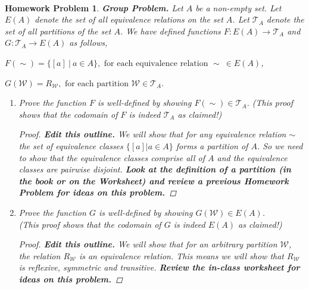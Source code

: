 \documentclass{article}
\newtheorem{hw}{Homework Problem}
\begin{document}
	\underline{\hspace{5in}}


	\
	\begin{hw} {\bf Group Problem.} \newline
		Let $A$ be a non-empty set. Let $E(A)$ denote the set of all equivalence relations on the set $A$. Let $\mathcal{T}_A$ denote the set of all partitions of the set $A$.
		We have defined functions $F: E(A) \rightarrow \mathcal{T}_A$ and $G: \mathcal{T}_A \rightarrow E(A)$ as follows,
		\begin{center}
			$F(\sim) = \{ [a]  \ | \ a \in A \},  \textrm{ for each equivalence relation }  \sim  \  \in E(A)$,
		\end{center}
		\begin{center}
			$G(\mathcal{W}) = R_{\mathcal{W}}, \textrm{ for each partition  } \mathcal{W} \in \mathcal{T}_A.$
		\end{center}
		\begin{enumerate}
			\item  Prove the function $F$ is well-defined by showing $F(\sim) \in \mathcal{T}_A$.  \newline (This proof shows that the codomain of $F$ is indeed $\mathcal{T}_A$ as claimed!)
			\begin{proof}  {\bf Edit this outline.}%
				We will show that for any equivalence relation $\sim$ the set of equivalence classes $\{ [a] | a\in A \}$ forms a partition of $A$.
				So we need to show that the equivalence classes comprise all of $A$ and the equivalence classes are pairwise disjoint.
					{\bf Look at the definition of a partition (in the book or on the Worksheet) and review a previous Homework Problem for ideas on this problem.}
			\end{proof}
			\item  Prove the function $G$ is well-defined by showing $G(\mathcal{W}) \in E(A)$.  \\ (This proof shows that the codomain of $G$ is indeed $E(A)$ as claimed!)
			\begin{proof}  {\bf Edit this outline.} %
				We will show that for an arbitrary partition $\mathcal{W}$, the relation $R_{\mathcal{W}}$ is an equivalence relation. This means we will show that $R_{\mathcal{W}}$ is reflexive, symmetric and transitive.  {\bf Review the in-class worksheet for ideas on this problem.}
			\end{proof}

\end{enumerate}
\end{hw}
\end{document}

